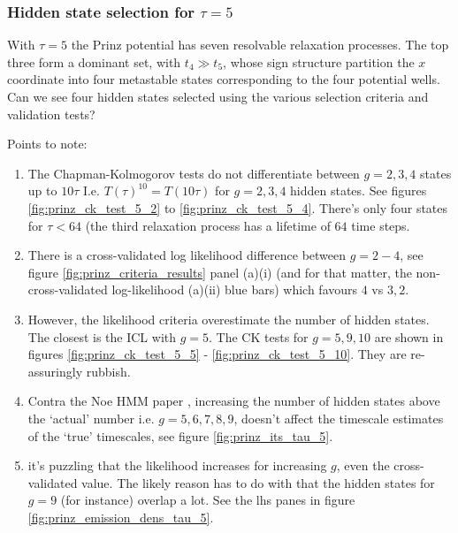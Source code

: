 
\subsubsection{Hidden state selection for $\tau=5$}
With $\tau = 5$ the Prinz potential has seven resolvable relaxation processes. The top three form a dominant set, with $t_4 \gg t_5$, whose sign structure partition the $x$ coordinate into four metastable states corresponding to the four potential wells. Can we see four hidden states selected using the various selection criteria and validation tests? 

Points to note: 
\begin{enumerate}
    \item The Chapman-Kolmogorov tests do not differentiate between $g = 2, 3, 4$ states up to $10\tau$ I.e. $T(\tau)^10 = T(10\tau)$ for $g = 2, 3, 4$ hidden states. See figures \ref{fig:prinz_ck_test_5_2} to \ref{fig:prinz_ck_test_5_4}. There's only four states for $\tau < 64$ (the third relaxation process has a lifetime of $64$ time steps. 
    \item There is a cross-validated log likelihood difference between $g = 2 - 4$, see figure \ref{fig:prinz_criteria_results} panel (a)(i) (and for that matter, the non-cross-validated log-likelihood (a)(ii) blue bars) which favours $4$ vs $3,2$. 
    \item However, the likelihood criteria overestimate the number of hidden states. The closest is the ICL with $g=5$. The CK tests for $g=5, 9, 10$ are shown in figures \ref{fig:prinz_ck_test_5_5} - \ref{fig:prinz_ck_test_5_10}. They are re-assuringly rubbish. 
    \item Contra the Noe HMM paper \cite{noeProjectedHiddenMarkov2013a}, increasing the number of hidden states above the `actual' number i.e. $g = 5, 6, 7, 8, 9$, doesn't affect the timescale estimates of the `true' timescales, see figure \ref{fig:prinz_its_tau_5}.
    \item it's puzzling that the likelihood increases for increasing $g$, even the cross-validated value. The likely reason has to do with that the hidden states for $g = 9$ (for instance) overlap a lot. See the lhs panes in figure \ref{fig:prinz_emission_dens_tau_5}.  
    
\end{enumerate}


